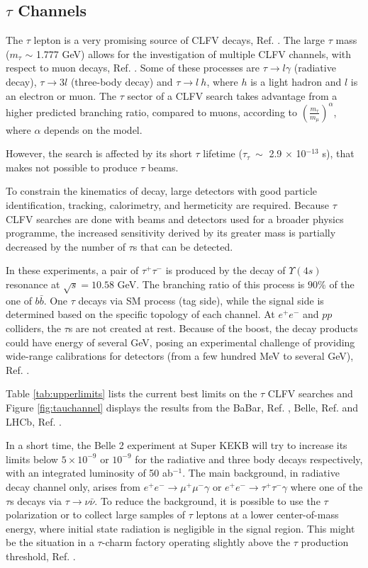 \subsection{$\tau$ Channels}
The $\tau$ lepton is a very promising 
source of CLFV decays, Ref. \cite{universe8060299}. 
The large $\tau$ mass ($m_\tau$ $\sim$ 1.777 GeV) 
allows for the investigation of multiple CLFV
channels, with respect to muon decays, 
Ref. \cite{clfv_signorelli}. 
Some of these processes are 
$\tau \rightarrow l \gamma$ (radiative decay), $\tau \rightarrow 3l$ (three-body decay) 
and $\tau\rightarrow l \ h$, 
where $h$ is a light hadron and $l$ 
is an electron or muon. The $\tau$ 
sector of a CLFV search takes advantage 
from a higher predicted branching ratio, 
compared to muons, 
according to $(\frac{m_\tau}{m_\mu})^\alpha$, 
where $\alpha$ depends on the model. 

However, the search is affected by its  
short $\tau$ lifetime  
($\tau_\tau \ \sim$ 2.9 $\times$ 10$^{-13}$ s), that 
makes not possible to produce 
$\tau$ beams.

To constrain the kinematics of decay, 
large detectors with good particle 
identification, tracking, calorimetry, 
and hermeticity are required. 
Because $\tau$ CLFV searches are done 
with beams and detectors used for a 
broader physics programme, 
the increased sensitivity derived by 
its greater mass is partially decreased 
by the number of $\tau$s that can be detected.

In these experiments, a pair of 
$\tau^+ \tau^-$ is produced by the 
decay of $\Upsilon(4s)$ resonance at 
$\sqrt{s}=10.58$ GeV. The branching ratio 
of this process is  $90\%$ of 
the one of $b \bar{b}$. One $\tau$ decays 
via SM process (tag side), 
while the signal side is determined based on 
the specific topology of each channel. 
At $e^+ e^-$ and $pp$ colliders, the $\tau$s 
are not created at rest. Because of the boost, 
the decay products could have 
energy of several GeV, posing an experimental 
challenge of providing wide-range calibrations 
for detectors (from a few hundred MeV to several GeV), 
Ref. \cite{universe8060299}.

Table \ref{tab:upperlimits} lists the 
current best limits on the $\tau$ 
CLFV searches and Figure \ref{fig:tauchannel} 
displays the results from the BaBar, 
Ref. \cite{PhysRevD.77.091104}, Belle, 
Ref. \cite{ABASHIAN2002117} and LHCb, 
Ref. \cite{TheLHCbCollaboration2008}. 

In a short time, the Belle 2 experiment at 
Super KEKB will try to increase its limits 
below $5 \times 10^{-9}$ or $10^{-9}$ for 
the radiative and three body decays respectively, 
with an integrated luminosity of 50 ab$^{-1}$. 
The main background, in radiative decay  
channel only, arises from
$e^+ e^- \rightarrow \mu^+ \mu^- \gamma$ or 
$e^+ e^- \rightarrow \tau^+ \tau^- \gamma$ 
where one of the $\tau$s decays via 
$\tau \rightarrow \nu \bar{\nu}$.
To reduce the background, it is possible to 
use the $\tau$ polarization or to collect 
large samples of
$\tau$ leptons at a lower center-of-mass energy, 
where initial state radiation is negligible in 
the signal region. This might be the situation 
in a $\tau$-charm 
factory operating slightly above the $\tau$ 
production threshold, Ref. \cite{Bennett_2016}. 


